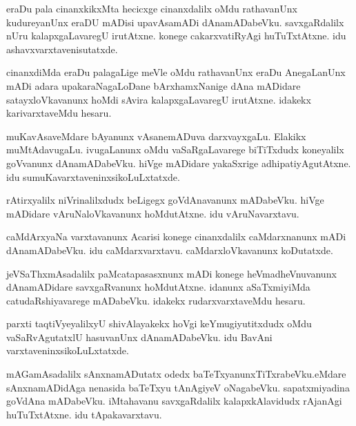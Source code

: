 \documentclass{article}
\begin{document}
\begin{mn}
eraDu  pala  cinanxkikxMta  hecicxge  cinanxdalilx  oMdu  rathavanUnx  kudureyanUnx  
eraDU  mADisi  upavAsamADi  dAnamADabeVku.  savxgaRdalilx  nUru  kalapxgaLavaregU  
irutAtxne.  konege  cakarxvatiRyAgi  huTuTxtAtxne.  idu  ashavxvarxtavenisutatxde.
\end{mn}

\begin{mn}
cinanxdiMda  eraDu  palagaLige  meVle  oMdu  rathavanUnx  eraDu  AnegaLanUnx  mADi  
adara  upakaraNagaLoDane  bArxhamxNanige  dAna mADidare  satayxloVkavanunx  hoMdi  
sAvira  kalapxgaLavaregU  irutAtxne.  idakekx  karivarxtaveMdu  hesaru.
\end{mn}

\begin{mn}
muKavAsaveMdare  bAyanunx  vAsanemADuva  darxvayxgaLu.  Elakikx  muMtAdavugaLu.  
ivugaLanunx  oMdu  vaSaRgaLavarege  biTiTxdudx  koneyalilx  goVvanunx  dAnamADabeVku.  
hiVge  mADidare  yakaSxrige  adhipatiyAgutAtxne.  idu  sumuKavarxtaveninxsikoLuLxtatxde.
\end{mn}

\begin{mn}
rAtirxyalilx  niVrinalilxdudx  beLigegx  goVdAnavanunx  mADabeVku.  hiVge  
mADidare  vAruNaloVkavanunx  hoMdutAtxne.  idu  vAruNavarxtavu.
\end{mn}

\begin{mn}
caMdArxyaNa varxtavanunx  Acarisi  konege  cinanxdalilx  caMdarxnanunx  mADi  
dAnamADabeVku.  idu  caMdarxvarxtavu.  caMdarxloVkavanunx  koDutatxde.
\end{mn}

\begin{mn}
jeVSaThxmAsadalilx  paMcatapasasxnunx  mADi  konege  heVmadheVnuvanunx  dAnamADidare  savxgaRvanunx  
hoMdutAtxne.  idanunx  aSaTxmiyiMda  catudaRshiyavarege  mADabeVku.  idakekx  rudarxvarxtaveMdu  hesaru.
\end{mn}

\begin{mn}
parxti  taqtiVyeyalilxyU  shivAlayakekx  hoVgi  keYmugiyutitxdudx  oMdu  
vaSaRvAgutatxlU  hasuvanUnx  dAnamADabeVku.  idu  BavAni  varxtaveninxsikoLuLxtatxde.
\end{mn}

\begin{mn}
mAGamAsadalilx  sAnxnamADutatx  odedx  baTeTxyanunxTiTxrabeVku.eMdare  sAnxnamADidAga  
nenasida  baTeTxyu  tAnAgiyeV  oNagabeVku.  sapatxmiyadina  goVdAna mADabeVku.  
iMtahavanu  savxgaRdalilx  kalapxkAlavidudx  rAjanAgi  huTuTxtAtxne.  idu  tApakavarxtavu.
\end{mn}
\end{document}
